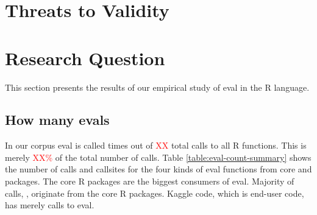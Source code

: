 \documentclass[conference]{IEEEtran}
\newcommand{\missingNumber}{\textcolor{red}{XX}\xspace}
\newcommand{\missingPercentage}{\textcolor{red}{XX\%}\xspace}
\begin{document}
\section{Threats to Validity}


\section{Research Question}
This section presents the results of our empirical study of eval in the R language.
\subsection{How many evals}

In our corpus eval is called \AllAllCallCountRnd{} times out of \missingNumber
total calls to all R functions. This is merely \missingPercentage of the total
number of calls. Table \ref{table:eval-count-summary} shows the number of
calls and callsites for the four kinds of eval functions from core and packages.
The core R packages are the biggest consumers of eval. Majority of calls,
\CoreAllCallCountRnd, originate from the core R packages. Kaggle code, which is
end-user code, has merely \KaggleAllCallCountRnd calls to eval.

\begin{table}[ht]
  \label{table:eval-count-summary}
  \caption{Distribution of eval calls and callsites in the corpus}
\end{table}
\end{document}
